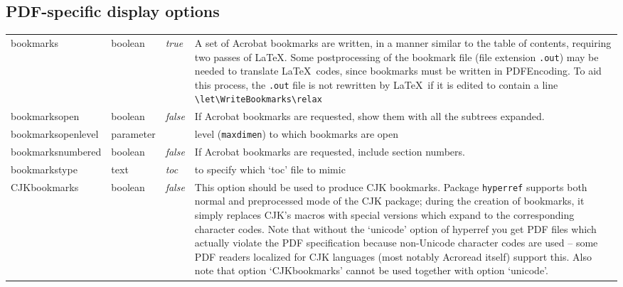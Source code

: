 \documentclass{article}
\newcommand*{\xpackage}[1]{\textsf{#1}}
\newcommand{\bs}{\symbol{'134}}%
\newcommand{\ci}[1]{\texttt{\bs#1}}
\begin{document}
\subsection{PDF-specific display options}
\begin{longtable}{@{}>{\ttfamily}ll>{\itshape}lp{7.6cm}@{}}
bookmarks          & boolean   & true   & A set of Acrobat bookmarks are written, in a manner similar to the
                                           table of contents, requiring two passes of \LaTeX. Some postprocessing
                                           of the bookmark file (file extension \texttt{.out}) may be needed to
                                           translate \LaTeX\ codes, since bookmarks must be written in  PDFEncoding.
                                           To aid this  process, the \texttt{.out} file is not rewritten by \LaTeX\
                                           if it is edited to contain a line \verb|\let\WriteBookmarks\relax| \\
bookmarksopen      & boolean   & false   & If Acrobat bookmarks are requested, show them with all the subtrees
                                           expanded. \\
bookmarksopenlevel & parameter &         & level (\ci{maxdimen}) to which bookmarks are open \\
bookmarksnumbered  & boolean   & false   & If Acrobat bookmarks are requested, include section numbers. \\
bookmarkstype      & text      & toc     & to specify which `toc' file to mimic \\
CJKbookmarks       & boolean   & false   &
    This option should be used to produce CJK bookmarks.
    Package \verb|hyperref|
    supports both normal and preprocessed mode of the \xpackage{CJK} package;
    during the creation of bookmarks, it simply replaces CJK's macros
    with special versions which expand to the corresponding character
    codes.  Note that without the `unicode' option of hyperref you get
    PDF files which actually violate the PDF specification because
    non-Unicode character codes are used -- some PDF readers localized
    for CJK languages (most notably Acroread itself) support this.
    Also note that option `CJKbookmarks' cannot be used together
    with option `unicode'.


\end{longtable}
\end{document}
